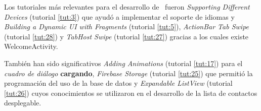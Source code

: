 	Los tutoriales más relevantes para el desarrollo de \CollegeApp\ fueron {\it Supporting Different Devices} (tutorial \ref{tut:3}) que ayudó a implementar el soporte de idiomas y {\it Building a Dynamic UI with Fragments} (tutorial \ref{tut:5}), {\it ActionBar Tab Swipe} (tutorial \ref{tut:28}) y {\it TabHost Swipe} (tutorial \ref{tut:27}) gracias a los cuales existe {\ttfamily WelcomeActivity}.
	
	 También han sido significativos {\it Adding Animations} (tutorial \ref{tut:17}) para el {\it cuadro de diálogo} {\bf cargando}, {\it Firebase Storage} (tutorial \ref{tut:25}) que permitió la programación del uso de la base de datos y {\it Expandable ListView} (tutorial \ref{tut:26}) cuyos conocimientos se utilizaron en el desarrollo de la lista de contactos desplegable.
